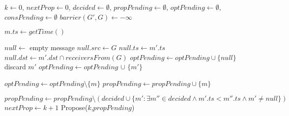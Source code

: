 \documentclass[times, 10pt]{article}
\begin{document}
\begin{algorithm}
\begin{distribalgo}[1]

\blankline
{}
  \STATE $k \leftarrow 0$, $nextProp \leftarrow 0$, $decided \leftarrow \emptyset$, $propPending \leftarrow \emptyset$, $optPending \leftarrow \emptyset$, $consPending \leftarrow \emptyset$
    \STATE $barrier(G',G) \leftarrow -\infty$ 
  \ENDINDENT
\ENDINDENT 

\blankline
{}
  \STATE $m.ts \leftarrow getTime()$  
  \STATE {}
\ENDINDENT

\blankline
{}
    \STATE $null \leftarrow$ empty message
    \STATE $null.src \leftarrow G$  
    \STATE $null.ts \leftarrow m'.ts$ \label{algline:nulltsmts}
    \STATE $null.dst \leftarrow m'.dst \cap receiversFrom(G)$
    \STATE $optPending \leftarrow optPending \cup \{null\}$
  \ENDIF
    \STATE discard $m'$
  \ELSE
    \STATE $optPending \leftarrow optPending$ $\cup$ $\{m'\}$
  \ENDIF
\ENDINDENT

\blankline
{}
  \STATE $optPending \leftarrow optPending \setminus \{m\}$
    \STATE {}  
  \ENDIF
    \STATE $propPending \leftarrow propPending \cup \{m\}$
  \ENDIF
\ENDINDENT

\blankline
{}
    \STATE $propPending \leftarrow propPending \setminus (decided \cup \{m' : \exists m'' \in decided \wedge m'.ts < m''.ts \wedge m' \neq null\})$ \label{algline:keepnull}
      \STATE $nextProp \leftarrow k + 1$
      \STATE Propose($k$,$propPending$)
    \ENDIF
\ENDINDENT


\end{distribalgo}
\end{algorithm}
\end{document}
